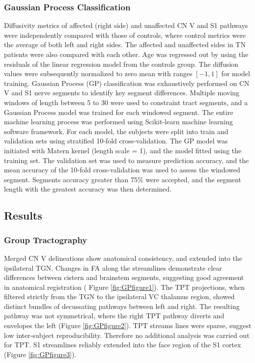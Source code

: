 \subsubsection{Gaussian Process Classification}

Diffusivity metrics of affected (right side) and unaffected CN V and S1 pathways were independently compared with those of controls, where control metrics were the average of both left and right sides. The affected and unaffected sides in TN patients were also compared with each other. 
Age was regressed out by using the residuals of the linear regression model from the controls group. The diffusion values were subsequently normalized to zero mean with ranges $[-1, 1]$ for model training. 
Gaussian Process (GP) classification was exhaustively performed on CN V and S1 nerve segments to identify key segment differences. Multiple moving windows of length between 5 to 30 were used to constraint tract segments, and a Gaussian Process model was trained for each windowed segment. The entire machine learning process was performed using Scikit-learn machine learning software framework.
For each model, the subjects were split into train and validation sets using stratified 10-fold cross-validation. The GP model was initiated with Matern kernel (length scale = 1), and the model fitted using the training set. The validation set was used to measure prediction accuracy, and the mean accuracy of the 10-fold cross-validation was used to assess the windowed segment. Segments accuracy greater than 75\% were accepted, and the segment length with the greatest accuracy was then determined. 

\subsection{Results}
\subsubsection{Group Tractography}
Merged CN V delineations show anatomical consistency, and extended into the ipsilateral TGN. Changes in FA along the streamlines demonstrate clear differences between cistern and brainstem segments, suggesting good agreement in anatomical registration ( Figure \ref{fig:GPfigure1}). 
The TPT projections, when filtered strictly from the TGN to the ipsilateral VC thalamus region, showed distinct bundles of decussating pathways between left and right. The resulting pathway was not symmetrical, where the right TPT pathway diverts and envelopes the left (Figure \ref{fig:GPfigure2}). TPT streams lines were sparse, suggest low inter-subject reproducibility. Therefore no additional analysis was carried out for TPT.
S1 streamlines reliably extended into the face region of the S1 cortex (Figure \ref{fig:GPfigure3}). 

